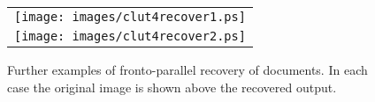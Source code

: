 \begin{figure}
\begin{center}
{\begin{tabular}{c}
		\\
		\texttt{[image: images/clut4recover1.ps]}    \\
		\texttt{[image: images/clut4recover2.ps]}
	\end{tabular} \label{empprf}
}


\end{center}
\caption{Further examples of fronto-parallel recovery of documents. In each case the original image is shown above the recovered output.}
\label{againmoreppresults}
\end{figure}


